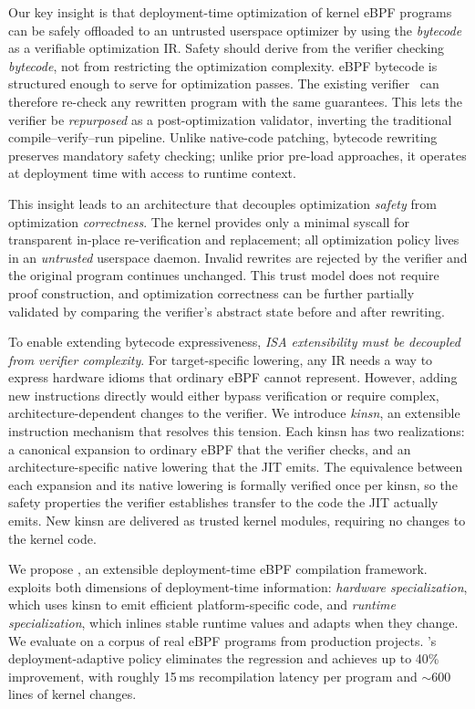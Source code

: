 Our key insight is that deployment-time optimization of kernel eBPF programs can be safely offloaded to an untrusted userspace optimizer by using the \emph{bytecode} as a verifiable optimization IR. 
Safety should derive from the verifier checking \emph{bytecode}, not from restricting the optimization complexity.
eBPF bytecode is structured enough to serve for optimization passes. The existing verifier~\cite{verifier} can therefore re-check any rewritten program with the same guarantees. This lets the verifier be \emph{repurposed} as a post-optimization validator, inverting the traditional compile--verify--run pipeline.
Unlike native-code patching, bytecode rewriting preserves mandatory safety checking; unlike prior pre-load approaches, it operates at deployment time with access to runtime context.

This insight leads to an architecture that decouples optimization \emph{safety} from optimization \emph{correctness}. The kernel provides only a minimal syscall for transparent in-place re-verification and replacement; all optimization policy lives in an \emph{untrusted} userspace daemon. Invalid rewrites are rejected by the verifier and the original program continues unchanged. This trust model does not require proof construction\cite{necula1997pcc}, and optimization correctness can be further partially validated by comparing the verifier's abstract state before and after rewriting.

To enable extending bytecode expressiveness, \emph{ISA extensibility must be decoupled from verifier complexity}. For target-specific lowering, any IR needs a way to express hardware idioms that ordinary eBPF cannot represent. However, adding new instructions directly would either bypass verification or require complex, architecture-dependent changes to the verifier. We introduce \emph{kinsn}, an extensible instruction mechanism that resolves this tension. Each kinsn has two realizations: a canonical expansion to ordinary eBPF that the verifier checks, and an architecture-specific native lowering that the JIT emits. The equivalence between each expansion and its native lowering is formally verified once per kinsn, so the safety properties the verifier establishes transfer to the code the JIT actually emits. New kinsn are delivered as trusted kernel modules, requiring no changes to the kernel code.

We propose \tool, an extensible deployment-time eBPF compilation framework. \tool exploits both dimensions of deployment-time information: \emph{hardware specialization}, which uses kinsn to emit efficient platform-specific code, and \emph{runtime specialization}, which inlines stable runtime values and adapts when they change. We evaluate \tool on a corpus of real eBPF programs from production projects. \tool's deployment-adaptive policy eliminates the regression and achieves up to 40\% improvement, with roughly 15\,ms recompilation latency per program and ${\sim}600$ lines of kernel changes.

